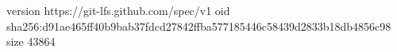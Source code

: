 version https://git-lfs.github.com/spec/v1
oid sha256:d91ae465ff40b9bab37fdcd27842ffba577185446c58439d2833b18db4856c98
size 43864
